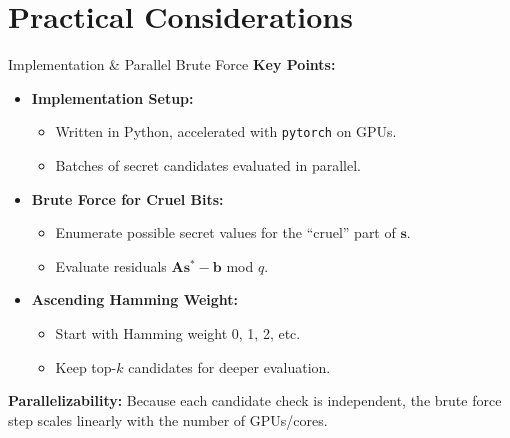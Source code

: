 \documentclass{beamer}
\begin{document}
\section{Practical Considerations}
\begin{frame}{Implementation \& Parallel Brute Force}
  \textbf{Key Points:}
  \begin{itemize}
    \item \textbf{Implementation Setup:}
      \begin{itemize}
        \item Written in Python, accelerated with \texttt{pytorch} on GPUs.
        \item Batches of secret candidates evaluated in parallel.
      \end{itemize}
    \item \textbf{Brute Force for Cruel Bits:}
      \begin{itemize}
        \item Enumerate possible secret values for the ``cruel'' part of $\mathbf{s}$.
        \item Evaluate residuals $\mathbf{A}\mathbf{s}^* - \mathbf{b}$ mod $q$.
      \end{itemize}
    \item \textbf{Ascending Hamming Weight:}
      \begin{itemize}
        \item Start with Hamming weight 0, 1, 2, etc.
        \item Keep top-$k$ candidates for deeper evaluation.
      \end{itemize}
  \end{itemize}

  \vspace{0.3cm}
  \textbf{Parallelizability:}  
  Because each candidate check is independent, the brute force step scales linearly with the number of GPUs/cores.
\end{frame}
\end{document}
